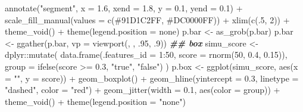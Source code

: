 \documentclass[
]{article}
\newenvironment{Shaded}{\begin{snugshade}}{\end{snugshade}}
\newcommand{\AttributeTok}[1]{\textcolor[rgb]{0.77,0.63,0.00}{#1}}
\newcommand{\DecValTok}[1]{\textcolor[rgb]{0.00,0.00,0.81}{#1}}
\newcommand{\DocumentationTok}[1]{\textcolor[rgb]{0.56,0.35,0.01}{\textbf{\textit{#1}}}}
\newcommand{\FloatTok}[1]{\textcolor[rgb]{0.00,0.00,0.81}{#1}}
\newcommand{\FunctionTok}[1]{\textcolor[rgb]{0.00,0.00,0.00}{#1}}
\newcommand{\NormalTok}[1]{#1}
\newcommand{\OtherTok}[1]{\textcolor[rgb]{0.56,0.35,0.01}{#1}}
\newcommand{\SpecialCharTok}[1]{\textcolor[rgb]{0.00,0.00,0.00}{#1}}
\newcommand{\StringTok}[1]{\textcolor[rgb]{0.31,0.60,0.02}{#1}}
\begin{document}
\begin{Shaded}
\begin{Highlighting}[]
  \FunctionTok{annotate}\NormalTok{(}\StringTok{"segment"}\NormalTok{, }\AttributeTok{x =} \FloatTok{1.6}\NormalTok{, }\AttributeTok{xend =} \FloatTok{1.8}\NormalTok{, }\AttributeTok{y =} \FloatTok{0.1}\NormalTok{, }\AttributeTok{yend =} \FloatTok{0.1}\NormalTok{) }\SpecialCharTok{+}
  \FunctionTok{scale\_fill\_manual}\NormalTok{(}\AttributeTok{values =} \FunctionTok{c}\NormalTok{(}\StringTok{\textquotesingle{}\#91D1C2FF\textquotesingle{}}\NormalTok{, }\StringTok{\textquotesingle{}\#DC0000FF\textquotesingle{}}\NormalTok{)) }\SpecialCharTok{+}
  \FunctionTok{xlim}\NormalTok{(}\FunctionTok{c}\NormalTok{(.}\DecValTok{5}\NormalTok{, }\DecValTok{2}\NormalTok{)) }\SpecialCharTok{+}
  \FunctionTok{theme\_void}\NormalTok{() }\SpecialCharTok{+}
  \FunctionTok{theme}\NormalTok{(}\AttributeTok{legend.position =} \StringTok{\textquotesingle{}none\textquotesingle{}}\NormalTok{)}
\NormalTok{p.bar }\OtherTok{\textless{}{-}} \FunctionTok{as\_grob}\NormalTok{(p.bar)}
\NormalTok{p.bar }\OtherTok{\textless{}{-}} \FunctionTok{ggather}\NormalTok{(p.bar, }\AttributeTok{vp =} \FunctionTok{viewport}\NormalTok{(, , .}\DecValTok{95}\NormalTok{, .}\DecValTok{9}\NormalTok{))}
\DocumentationTok{\#\# box}
\NormalTok{simu\_score }\OtherTok{\textless{}{-}}\NormalTok{ dplyr}\SpecialCharTok{::}\FunctionTok{mutate}\NormalTok{(}
  \FunctionTok{data.frame}\NormalTok{(}\AttributeTok{.features\_id =} \DecValTok{1}\SpecialCharTok{:}\DecValTok{50}\NormalTok{, }\AttributeTok{score =} \FunctionTok{rnorm}\NormalTok{(}\DecValTok{50}\NormalTok{, }\FloatTok{0.4}\NormalTok{, }\FloatTok{0.15}\NormalTok{)),}
  \AttributeTok{group =} \FunctionTok{ifelse}\NormalTok{(score }\SpecialCharTok{\textgreater{}=} \FloatTok{0.3}\NormalTok{, }\StringTok{"true"}\NormalTok{, }\StringTok{"false"}\NormalTok{)}
\NormalTok{)}
\NormalTok{p.box }\OtherTok{\textless{}{-}} \FunctionTok{ggplot}\NormalTok{(simu\_score, }\FunctionTok{aes}\NormalTok{(}\AttributeTok{x =} \StringTok{""}\NormalTok{, }\AttributeTok{y =}\NormalTok{ score)) }\SpecialCharTok{+}
  \FunctionTok{geom\_boxplot}\NormalTok{() }\SpecialCharTok{+}
  \FunctionTok{geom\_hline}\NormalTok{(}\AttributeTok{yintercept =} \FloatTok{0.3}\NormalTok{, }\AttributeTok{linetype =} \StringTok{"dashed"}\NormalTok{, }\AttributeTok{color =} \StringTok{"red"}\NormalTok{) }\SpecialCharTok{+}
  \FunctionTok{geom\_jitter}\NormalTok{(}\AttributeTok{width =} \FloatTok{0.1}\NormalTok{, }\FunctionTok{aes}\NormalTok{(}\AttributeTok{color =}\NormalTok{ group)) }\SpecialCharTok{+}
  \FunctionTok{theme\_void}\NormalTok{() }\SpecialCharTok{+}
  \FunctionTok{theme}\NormalTok{(}\AttributeTok{legend.position =} \StringTok{"none"}\NormalTok{)}

\end{Highlighting}
\end{Shaded}
\end{document}
